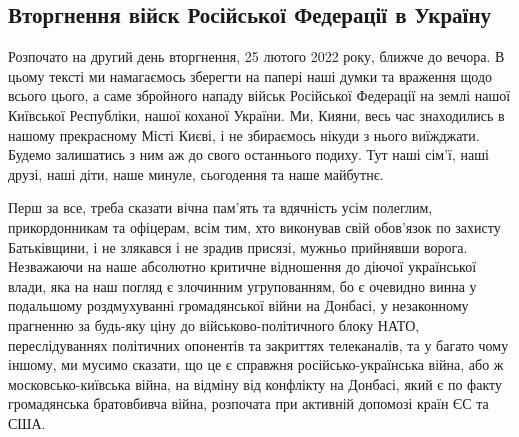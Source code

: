  
 
 
 
 
\subsection{Вторгнення війск Російської Федерації в Україну}

Розпочато на другий день вторгнення, 25 лютого 2022 року, ближче до вечора. В
цьому тексті ми намагаємось зберегти на папері наші думки та враження щодо
всього цього, а саме збройного нападу військ Російської Федерації на землі
нашої Київської Республіки, нашої коханої України. Ми, Кияни, весь час
знаходились в нашому прекрасному Місті Києві, і не збираємось нікуди з нього
виїжджати. Будемо залишатись з ним аж до свого останнього подиху. Тут наші
сім'ї, наші друзі, наші діти, наше минуле, сьогодення та наше майбутнє. 

Перш за все, треба сказати вічна пам'ять та вдячність усім полеглим,
прикордонникам та офіцерам, всім тим, хто виконував свій обов'язок по захисту
Батьківщини, і не злякався і не зрадив присязі, мужньо прийнявши ворога.
Незважаючи на наше абсолютно критичне відношення до діючої української влади,
яка на наш погляд є злочинним угрупованням, бо є очевидно винна у подальшому
роздмухуванні громадянської війни на Донбасі, у незаконному прагненню за
будь-яку ціну до військово-політичного блоку НАТО, переслідуваннях політичних
опонентів та закриттях телеканалів, та у багато чому іншому, ми мусимо сказати,
що це є справжня російсько-українська війна, або ж московсько-київська війна,
на відміну від конфлікту на Донбасі, який є по факту громадянська братовбивча
війна, розпочата при активній допомозі країн ЄС та США. 
